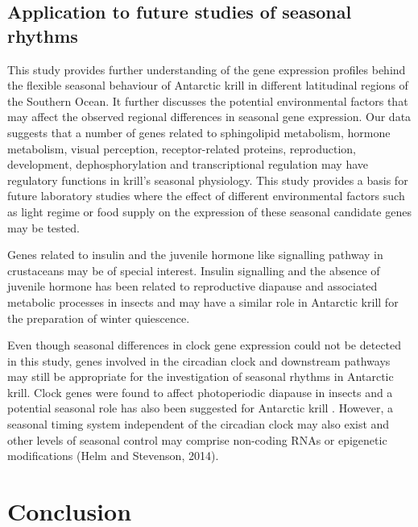 \subsection{Application to future studies of seasonal rhythms}

This study provides further understanding of the gene expression profiles
behind the flexible seasonal behaviour of Antarctic krill in different
latitudinal regions of the Southern Ocean. It further discusses the potential
environmental factors that may affect the observed regional differences in
seasonal gene expression. Our data suggests that a number of genes related to
sphingolipid metabolism, hormone metabolism, visual perception,
receptor-related proteins, reproduction, development, dephosphorylation and
transcriptional regulation may have regulatory functions in krill's seasonal
physiology. This study provides a basis for future laboratory studies where the
effect of different environmental factors such as light regime or food supply
on the expression of these seasonal candidate genes may be tested. 

Genes related to insulin and the juvenile hormone like signalling pathway in
crustaceans may be of special interest. Insulin signalling
\citep{sim_insulin_2013} and the absence of juvenile hormone has been related
to reproductive diapause and associated metabolic processes in insects
\citep{liu_absence_2017} and may have a similar role in Antarctic krill for the
preparation of winter quiescence.

Even though seasonal differences in clock gene expression could not be detected
in this study, genes involved in the circadian clock and downstream pathways
may still be appropriate for the investigation of seasonal rhythms in Antarctic
krill. Clock genes were found to affect photoperiodic diapause in insects
\citep{ikeno_photoperiodic_2010} and a potential seasonal role has also been
suggested for Antarctic krill \citep{piccolin_seasonal_2018}. However, a
seasonal timing system independent of the circadian clock may also exist
\citep{bradshaw_circadian_2006} and other levels of seasonal control may
comprise non-coding RNAs or epigenetic modifications (Helm and Stevenson,
2014).

\section{Conclusion}

